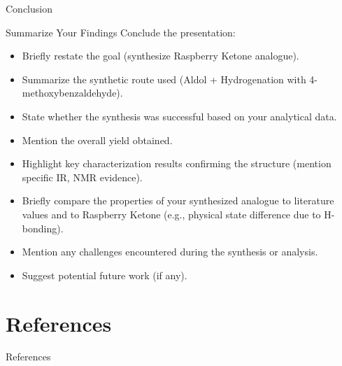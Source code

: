 \documentclass[10pt]{beamer}
\begin{document}
\begin{frame}{Conclusion}
     \begin{alertblock}{Summarize Your Findings}
        Conclude the presentation:
        \begin{itemize}
            \item Briefly restate the goal (synthesize Raspberry Ketone analogue).
            \item Summarize the synthetic route used (Aldol + Hydrogenation with 4-methoxybenzaldehyde).
            \item State whether the synthesis was successful based on your analytical data.
            \item Mention the overall yield obtained.
            \item Highlight key characterization results confirming the structure (mention specific IR, NMR evidence).
            \item Briefly compare the properties of your synthesized analogue to literature values and to Raspberry Ketone (e.g., physical state difference due to H-bonding).
            \item Mention any challenges encountered during the synthesis or analysis.
            \item Suggest potential future work (if any).
        \end{itemize}
     \end{alertblock}
\end{frame}

\section*{References} %

\begin{frame}[allowframebreaks]{References} %
    \printbibliography
\end{frame}

\end{document}
